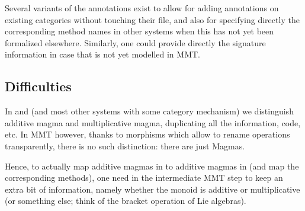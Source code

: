 Several variants of the annotations exist to allow for adding
annotations on existing categories without touching their file, and also
for specifying directly the corresponding method names in other systems
when this has not yet been formalized elsewhere. Similarly, one could
provide directly the signature information in case that is not yet
modelled in MMT.

\subsection{Difficulties}\label{difficulties}

In \Sage and \GAP (and most other systems with some category mechanism) we distinguish
additive magma and multiplicative magma, duplicating all the information, code, etc. In
MMT however, thanks to morphisms which allow to rename operations transparently, there is
no such distinction: there are just Magmas.

Hence, to actually map additive magmas in \Sage to additive magmas in \GAP (and map the
corresponding methods), one need in the intermediate MMT step to keep an extra bit of
information, namely whether the monoid is additive or multiplicative (or something else;
think of the bracket operation of Lie algebras).



